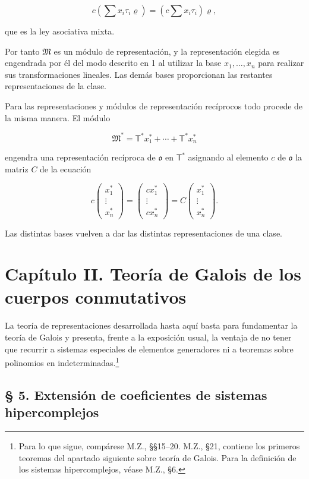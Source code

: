 \[
c\left(\sum x_i\tau_i\varrho\right)=\left(c\sum x_i\tau_i\right)\varrho,
\]

que es la ley asociativa mixta.

Por tanto $\mathfrak M$ es un módulo de representación, y la representación elegida es engendrada por él del modo descrito en 1 al utilizar la base $x_1,\ldots,x_n$ para realizar sus transformaciones lineales. Las demás bases proporcionan las restantes representaciones de la clase.

Para las representaciones y módulos de representación recíprocos todo procede de la misma manera. El módulo

\[
\mathfrak M^*=\mathsf T^*x_1^*+\cdots+\mathsf T^*x_n^*
\]

engendra una representación recíproca de $\mathfrak{o}$ en $\mathsf T^*$ asignando al elemento $c$ de $\mathfrak{o}$ la matriz $C$ de la ecuación

\[
c\begin{pmatrix}x_1^*\\ \vdots\\ x_n^*\end{pmatrix}
=\begin{pmatrix}cx_1^*\\ \vdots\\ cx_n^*\end{pmatrix}
=C\begin{pmatrix}x_1^*\\ \vdots\\ x_n^*\end{pmatrix}.
\]

Las distintas bases vuelven a dar las distintas representaciones de una clase.

\section*{Capítulo II. Teoría de Galois de los cuerpos conmutativos}

La teoría de representaciones desarrollada hasta aquí basta para fundamentar la teoría de Galois y presenta, frente a la exposición usual, la ventaja de no tener que recurrir a sistemas especiales de elementos generadores ni a teoremas sobre polinomios en indeterminadas.\footnote{Para lo que sigue, compárese M.Z., §§15--20. M.Z., §21, contiene los primeros teoremas del apartado siguiente sobre teoría de Galois. Para la definición de los sistemas hipercomplejos, véase M.Z., §6.}

\subsection*{§ 5. Extensión de coeficientes de sistemas hipercomplejos}

